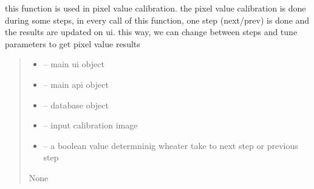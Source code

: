 \documentclass[letterpaper,10pt,english]{sphinxmanual}
\begin{document}
\begin{savenotes}\begin{fulllineitems}
\label{\detokenize{setting/backend/pxvalue_calibration:oxin.backend.pxvalue_calibration.apply_pxvalue_calibration}}
\pysigstartsignatures
{}
\pysigstopsignatures
\sphinxAtStartPar
this function is used in pixel value calibration.
the pixel value calibration is done during some steps,
in every call of this function, one step (next/prev) is done and the results are updated on ui.
this way, we can change between steps and tune parameters to get pixel value results
\begin{quote}\begin{description}
\begin{itemize}
\item {} 
\sphinxAtStartPar
{} – main ui object

\item {} 
\sphinxAtStartPar
{} – main api object

\item {} 
\sphinxAtStartPar
{} – database object

\item {} 
\sphinxAtStartPar
{} – input calibration image

\item {} 
\sphinxAtStartPar
{} – a boolean value determninig wheater take to next step or previous step

\end{itemize}

\sphinxAtStartPar
None

\end{description}\end{quote}

\end{fulllineitems}\end{savenotes}

\end{document}
